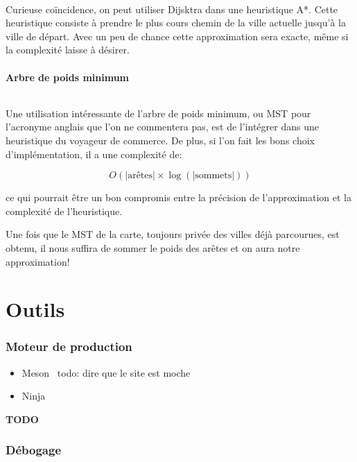 \documentclass[french]{article}
\begin{document}
\paragraph{} Curieuse coïncidence, on peut utiliser Dijsktra dans une
heuristique A*. Cette heuristique consiste à prendre le plus cours chemin de la
ville actuelle jusqu'à la ville de départ. Avec un peu de chance cette
approximation sera exacte, même si la complexité laisse à désirer.

\subsection{Arbre de poids minimum}

\paragraph{} Une utilisation intéressante de l'arbre de poids minimum, ou MST
pour l'acronyme anglais que l'on ne commentera pas, est de l'intégrer dans une
heuristique du voyageur de commerce. De plus, si l'on fait les bons choix
d'implémentation, il a une complexité de:

\[O(|\text{arêtes}| \times \log\left(|\text{sommets}|\right))\]

ce qui pourrait être un bon compromis entre la précision de l'approximation et
la complexité de l'heuristique.

Une fois que le MST de la carte, toujours privée des villes déjà parcourues,
est obtenu, il nous suffira de sommer le poids des arêtes et on aura notre
approximation!

\part{Outils}

\section{Moteur de production}

\begin{itemize}
	\item Meson~\cite{tools:meson} todo: dire que le site est moche
	\item Ninja~\cite{tools:ninja}
\end{itemize}

\textbf{\Huge{TODO}}

\section{Débogage}
\end{document}
